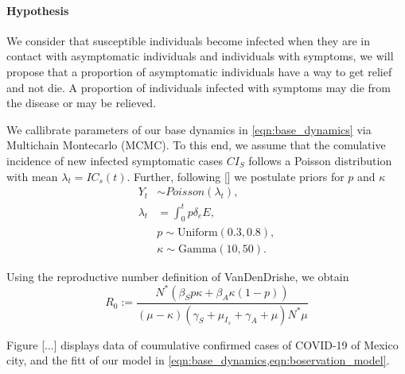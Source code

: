     \paragraph{Hypothesis} 
    	We consider that susceptible individuals become
    infected when they are in contact with asymptomatic individuals and
    individuals with symptoms, we will propose that a proportion of
    asymptomatic individuals have a way to get relief and not die. A
    proportion of individuals infected with symptoms may die from the
    disease or may be relieved.

    	We callibrate parameters of our base dynamics in
    \eqref{eqn:base_dynamics} via Multichain Montecarlo (MCMC).
    To this end, we assume that the comulative
    incidence of new infected symptomatic cases $CI_S$
    follows a Poisson distribution with mean $\lambda_t = IC_s(t)$. Further,
    following [] we postulate priors for $p$ and $\kappa$
    \begin{equation}
    	\label{eqn:boservation_model}
    	\begin{aligned}
    		Y_t & \sim Poisson(\lambda_t),
    		\\
    		\lambda_t
    			&=
    			\int_{0}^t p \delta_e E ,
    		\\
    			& p \sim \text{Uniform} (0.3, 0.8),
    		\\
    			& \kappa \sim \text{Gamma}(10, 50).
    	\end{aligned}
    \end{equation}
	
	Using the reproductive number definition of VanDenDrishe, we obtain
\begin{equation*}
	\label{eqn:reproductive_number}
	R_0 :=
		\frac{
			N^{*}(
				\beta_S p
				\kappa +
				\beta_A
				\kappa(1-p) )
		}{
			(\mu - \kappa)( \gamma_S + \mu_{I_s} + \gamma_A + \mu)
			N^* \mu
		}
\end{equation*}

    Figure [...] displays data of coumulative confirmed cases of COVID-19 of
Mexico city, and the fitt of our model in
\cref{eqn:base_dynamics,eqn:boservation_model}.
